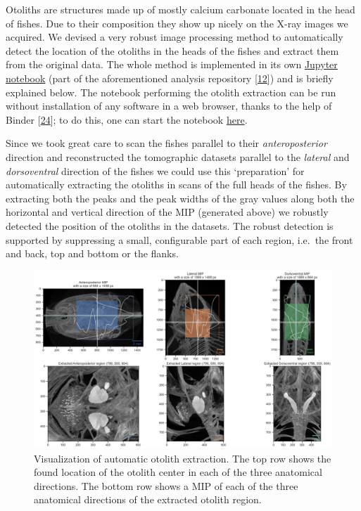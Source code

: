 Otoliths are structures made up of mostly calcium carbonate located in the head of fishes.
Due to their composition they show up nicely on the X-ray images we acquired.
We devised a very robust image processing method to automatically detect the location of the otoliths in the heads of the fishes and extract them from the original data.
The whole method is implemented in its own \href{https://github.com/habi/EAWAG/blob/master/ExtractOtoliths.ipynb}{Jupyter notebook} (part of the aforementioned analysis repository {[}\protect\hyperlink{ref-1HteOscVd}{12}{]}) and is briefly explained below.
The notebook performing the otolith extraction can be run without installation of any software in a web browser, thanks to the help of Binder {[}\protect\hyperlink{ref-Q20Bxdsr}{24}{]}; to do this, one can start the notebook \href{https://mybinder.org/v2/gh/habi/EAWAG/HEAD?labpath=ExtractOtoliths.ipynb}{here}.

Since we took great care to scan the fishes parallel to their \emph{anteroposterior} direction and reconstructed the tomographic datasets parallel to the \emph{lateral} and \emph{dorsoventral} direction of the fishes we could use this `preparation' for automatically extracting the otoliths in scans of the full heads of the fishes.
By extracting both the peaks and the peak widths of the gray values along both the horizontal and vertical direction of the MIP (generated above) we robustly detected the position of the otoliths in the datasets.
The robust detection is supported by suppressing a small, configurable part of each region, i.e.~the front and back, top and bottom or the flanks.

\begin{figure}
\hypertarget{fig:otolithextraction}{%
\centering
\includegraphics{images/104016.head.rec.otolither.position.png}
\caption{Visualization of automatic otolith extraction. The top row shows the found location of the otolith center in each of the three anatomical directions. The bottom row shows a MIP of each of the three anatomical directions of the extracted otolith region.}\label{fig:otolithextraction}
}
\end{figure}


